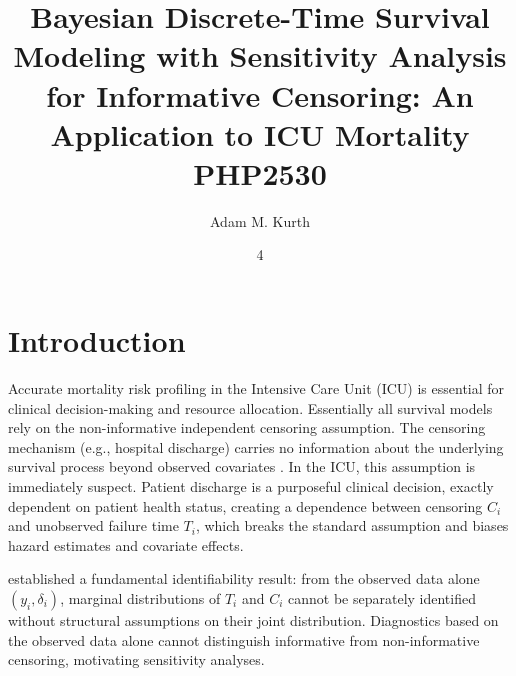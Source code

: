 \documentclass[twoside,11pt]{article}
\begin{document}
\title{	Bayesian Discrete-Time Survival Modeling with Sensitivity Analysis for Informative Censoring: An Application to ICU Mortality\\
\vspace{.1in}
PHP2530
}


\author{ Adam M. Kurth}

\maketitle
\date{4 }


\section{Introduction} \label{sc:intro}

 
Accurate mortality risk profiling in the Intensive Care Unit (ICU) is essential for clinical decision-making and resource allocation. Essentially all survival models rely on the non-informative independent censoring assumption. The censoring mechanism (e.g., hospital discharge) carries no information about the underlying survival process beyond observed covariates \citep{kalbfleisch2003statistical}. In the ICU, this assumption is immediately suspect. Patient discharge is a purposeful clinical decision, exactly dependent on patient health status, creating a dependence between censoring $C_i$ and unobserved failure time $T_i$, which breaks the standard assumption and biases hazard estimates and covariate effects.
 
\citet{tsiatis1975} established a fundamental identifiability result: from the observed data alone $(y_i, \delta_i)$, marginal distributions of $T_i$ and $C_i$ cannot be separately identified without structural assumptions on their joint distribution. Diagnostics based on the observed data alone cannot distinguish informative from non-informative censoring, motivating sensitivity analyses.
 
\end{document}
